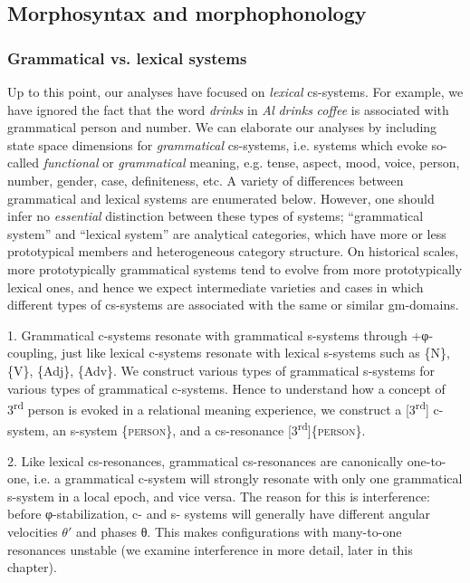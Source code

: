 \subsection{Morphosyntax and morphophonology}
\subsubsection{Grammatical vs. lexical systems}

Up to this point, our analyses have focused on \textit{lexical} cs-systems. For example, we have ignored the fact that the word \textit{drinks} in \textit{Al} \textit{drinks} \textit{coffee} is associated with grammatical person and number. We can elaborate our analyses by including state space dimensions for \textit{grammatical} cs-systems, i.e. systems which evoke so-called \textit{functional} or \textit{grammatical} meaning, e.g. tense, aspect, mood, voice, person, number, gender, case, definiteness, etc. A variety of differences between grammatical and lexical systems are enumerated below. However, one should infer no \textit{essential} distinction between these types of systems; “grammatical system” and “lexical system” are analytical categories, which have more or less prototypical members and heterogeneous category structure. On historical scales, more prototypically grammatical systems tend to evolve from more prototypically lexical ones, and hence we expect intermediate varieties and cases in which different types of cs-systems are associated with the same or similar gm-domains. 

1. Grammatical c-systems resonate with grammatical s-systems through +φ-coupling, just like lexical c-systems resonate with lexical s-systems such as \{N\}, \{V\}, \{Adj\}, \{Adv\}. We construct various types of grammatical s-systems for various types of grammatical c-systems. Hence to understand how a concept of 3\textsuperscript{rd} person is evoked in a relational meaning experience, we construct a [3\textsuperscript{rd}] c-system, an s-system \{\textsc{person}\}, and a cs-resonance [3\textsuperscript{rd}]\{\textsc{person}\}. 

2. Like lexical cs-resonances, grammatical cs-resonances are canonically one-to-one, i.e. a grammatical c-system will strongly resonate with only one grammatical s-system in a local epoch, and vice versa. The reason for this is interference: before φ-stabilization, c- and s- systems will generally have different angular velocities $\theta ′$ and phases θ. This makes configurations with many-to-one resonances unstable (we examine interference in more detail, later in this chapter).

